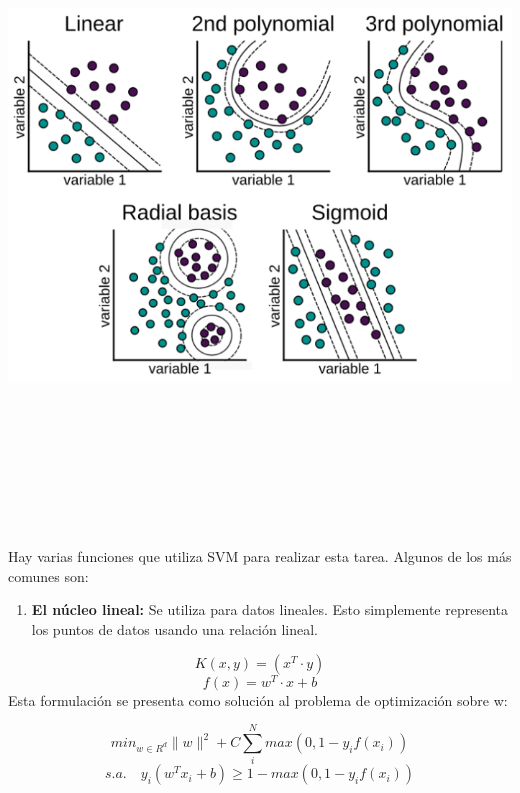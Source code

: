 \documentclass[
]{book}
\providecommand{\tightlist}{%
  \setlength{\itemsep}{0pt}\setlength{\parskip}{0pt}}
\begin{document}
\begin{center}\includegraphics[width=700pt,height=500pt]{img/03-svm/06_kernels} \end{center}

Hay varias funciones que utiliza SVM para realizar esta tarea. Algunos de los más comunes son:

\begin{enumerate}
\def\labelenumi{\arabic{enumi}.}
\tightlist
\item
  \textbf{El núcleo lineal:} Se utiliza para datos lineales. Esto simplemente representa los puntos de datos usando una relación lineal.
\end{enumerate}

\[K(x, y)=(x^T \cdot y)\]
\[f(x)=w^T \cdot x + b\]
Esta formulación se presenta como solución al problema de optimización sobre w:

\[min_{w\in R^d} \parallel w \parallel ^2+ C\sum_{i}^{N}{max(0, 1-y_if(x_i))}\]
\[s.a. \quad y_i(w^T x_i+b) \geq 1 - max(0, 1-y_if(x_i))\]
\end{document}
